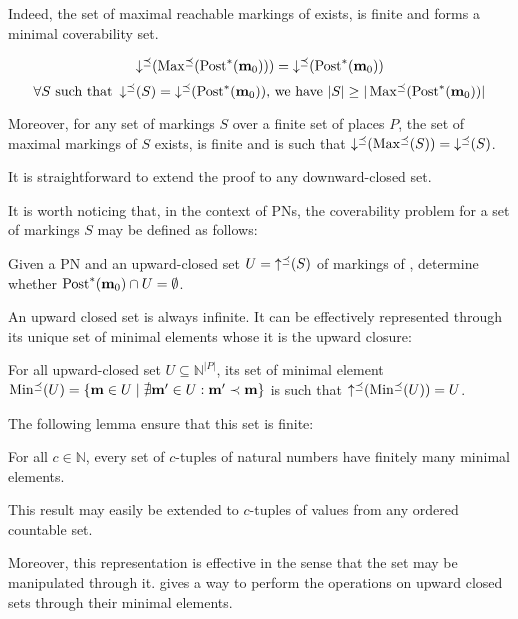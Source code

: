 Indeed, the set of maximal reachable markings of \N exists, is finite and forms a minimal coverability set.

\[\operatorname{\downarrow^\preceq}(\operatorname{Max^\preceq}(\operatorname{Post}^*(\mathbf{m}_0))) = \operatorname{\downarrow^\preceq}(\operatorname{Post}^*(\mathbf{m}_0))\]
\[\forall S \text{ such that } \operatorname{\downarrow^\preceq}(S) = \operatorname{\downarrow^\preceq}(\operatorname{Post}^*(\mathbf{m}_0))\text{, we have } |S| \geq |\operatorname{Max^\preceq}(\operatorname{Post}^*(\mathbf{m}_0))|\]

Moreover, for any set of markings $S$ over a finite set of places $P$, the set of maximal markings of $S$ exists, is finite and is such that $\operatorname{\downarrow^\preceq}(\operatorname{Max^\preceq}(S)) = \operatorname{\downarrow^\preceq}(S)$.


It is straightforward to extend the proof to any downward-closed set.

It is worth noticing that, in the context of \acp{PN}, the coverability problem for a set of markings $S$ may be defined as follows:
\begin{defi}
  \label{defi:upclocovprblm}
  Given a \ac{PN} \N and an upward-closed set $U = \operatorname{\uparrow^\preceq}(S)$ of markings of \N, determine whether $\operatorname{Post}^*(\mathbf{m}_0) \cap U = \emptyset$.
\end{defi}

An upward closed set is always infinite.
It can be effectively represented through its unique set of minimal elements whose it is the upward closure:
\begin{lemm}
  For all upward-closed set $U \subseteq \mathbb{N}^{|P|}$, its set of minimal element $\operatorname{Min^\preceq}(U) = \{\mathbf{m} \in U \mid \nexists \mathbf{m'} \in U : \mathbf{m'} \prec \mathbf{m}\}$ is such that $\operatorname{\uparrow^\preceq}(\operatorname{Min^\preceq}(U)) = U$.
\end{lemm}

The following lemma ensure that this set is finite:
\begin{lemm}
  For all $c \in \mathbb{N}$, every set of $c$-tuples of natural numbers have finitely many minimal elements.
\end{lemm}
This result may easily be extended to $c$-tuples of values from any ordered countable set.

Moreover, this representation is effective in the sense that the set may be manipulated through it.
\cite{Ganty09} gives a way to perform the operations on upward closed sets through their minimal elements.

